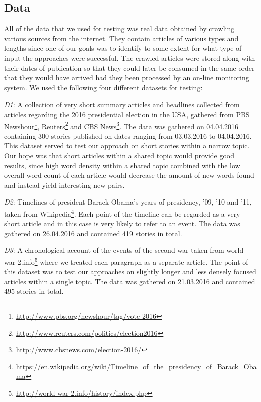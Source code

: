 
\subsection{Data}
All of the data that we used for testing was real data obtained by crawling various sources from the internet. They contain articles of various types and lengths since one of our goals was to identify to some extent for what type of input the approaches were successful. The crawled articles were stored along with their dates of publication so that they could later be consumed in the same order that they would have arrived had they been processed by an on-line monitoring system. We used the following four different datasets for testing:

\emph{D1}: A collection of very short summary articles and headlines collected from articles regarding the 2016 presidential election in the USA, gathered from PBS Newshour\footnote{\url{http://www.pbs.org/newshour/tag/vote-2016}}, Reuters\footnote{\url{http://www.reuters.com/politics/election2016}} and CBS News\footnote{\url{http://www.cbsnews.com/election-2016/}}. The data was gathered on 04.04.2016 containing 300 stories published on dates ranging from 03.03.2016 to 04.04.2016. This dataset served to test our approach on short stories within a narrow topic. Our hope was that short articles within a shared topic would provide good results, since high word density within a shared topic combined with the low overall word count of each article would decrease the amount of new words found and instead yield interesting new pairs.

\emph{D2}: Timelines of president Barack Obama's years of presidency, '09, '10 and '11, taken from Wikipedia\footnote{\url{https://en.wikipedia.org/wiki/Timeline_of_the_presidency_of_Barack_Obama}}. Each point of the timeline can be regarded as a very short article and in this case is very likely to refer to an event. The data was gathered on 26.04.2016 and contained 419 stories in total.

\emph{D3}: A chronological account of the events of the second war taken from world-war-2.info\footnote{\url{http://world-war-2.info/history/index.php}} where we treated each paragraph as a separate article. The point of this dataset was to test our approaches on slightly longer and less densely focused articles within a single topic. The data was gathered on 21.03.2016 and contained 495 stories in total.

